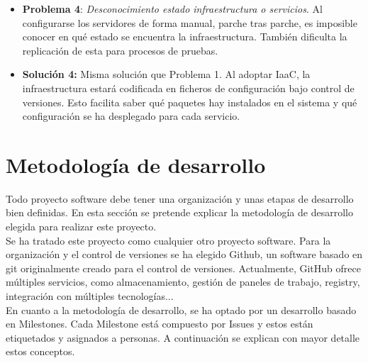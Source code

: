 \begin{itemize}
			\item \textbf{Problema 4}: \textit{Desconocimiento estado infraestructura o servicios}. Al configurarse los servidores de forma manual, parche tras parche, es imposible conocer en qué estado se encuentra la infraestructura. También dificulta la replicación de esta para procesos de pruebas.
			
			\item \textbf{Solución 4:} Misma solución que Problema 1. Al adoptar IaaC, la infraestructura estará codificada en ficheros de configuración bajo control de versiones. Esto facilita saber qué paquetes hay instalados en el sistema y qué configuración se ha desplegado para cada servicio.	
		\end{itemize}

\section{Metodología de desarrollo}
\begin{text}
	Todo proyecto software debe tener una organización y unas etapas de desarrollo bien definidas. En esta sección se pretende explicar la metodología de desarrollo elegida para realizar este proyecto. \\
	Se ha tratado este proyecto como cualquier otro proyecto software. Para la organización y el control de versiones se ha elegido Github, un software basado en git originalmente creado para el control de versiones. Actualmente, GitHub ofrece múltiples servicios, como almacenamiento, gestión de paneles de trabajo, registry, integración con múltiples tecnologías... \\
	En cuanto a la metodología de desarrollo, se ha optado por un desarrollo basado en Milestones. Cada Milestone está compuesto por Issues y estos están etiquetados y asignados a personas. A continuación se explican con mayor detalle estos conceptos.
\end{text}

